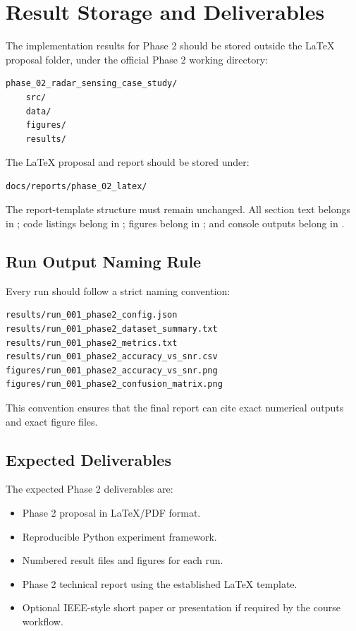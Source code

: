 \section{Result Storage and Deliverables}

The implementation results for Phase 2 should be stored outside the LaTeX proposal folder, under the official Phase 2 working directory:

\begin{verbatim}
phase_02_radar_sensing_case_study/
    src/
    data/
    figures/
    results/
\end{verbatim}

The LaTeX proposal and report should be stored under:

\begin{verbatim}
docs/reports/phase_02_latex/
\end{verbatim}

The report-template structure must remain unchanged. All section text belongs in ; code listings belong in ; figures belong in ; and console outputs belong in .

\subsection{Run Output Naming Rule}

Every run should follow a strict naming convention:

\begin{verbatim}
results/run_001_phase2_config.json
results/run_001_phase2_dataset_summary.txt
results/run_001_phase2_metrics.txt
results/run_001_phase2_accuracy_vs_snr.csv
figures/run_001_phase2_accuracy_vs_snr.png
figures/run_001_phase2_confusion_matrix.png
\end{verbatim}

This convention ensures that the final report can cite exact numerical outputs and exact figure files.

\subsection{Expected Deliverables}

The expected Phase 2 deliverables are:

\begin{itemize}
    \item Phase 2 proposal in LaTeX/PDF format.
    \item Reproducible Python experiment framework.
    \item Numbered result files and figures for each run.
    \item Phase 2 technical report using the established LaTeX template.
    \item Optional IEEE-style short paper or presentation if required by the course workflow.
\end{itemize}
